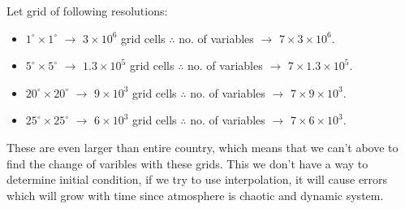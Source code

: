 \documentclass[fleqn,10pt]{SelfArx} %
\begin{document}
Let grid of following resolutions:
\begin{itemize}[noitemsep]
	\item $1^\circ\times 1^\circ$ $\rightarrow$ $3\times 10^6$ grid cells $\therefore$ no. of variables $\rightarrow$ $7 \times 3\times 10^6$.
	\item $5^\circ\times 5^\circ$ $\rightarrow$ $1.3\times 10^5$ grid cells $\therefore$ no. of variables $\rightarrow$ $7 \times 1.3\times 10^5$.
	\item $20^\circ\times 20^\circ$ $\rightarrow$ $9\times 10^3$ grid cells $\therefore$ no. of variables $\rightarrow$ $7 \times 9\times 10^3$.
	\item $25^\circ\times 25^\circ$ $\rightarrow$ $6\times 10^3$ grid cells $\therefore$ no. of variables $\rightarrow$ $7 \times 6\times 10^3$.
\end{itemize}
These are even larger than entire country, which means that we can't above to find the change of varibles with these grids. This we don't have a way to determine initial condition, if we try to use interpolation, it will cause errors which will grow with time since atmosphere is chaotic and dynamic system.

\end{document}
